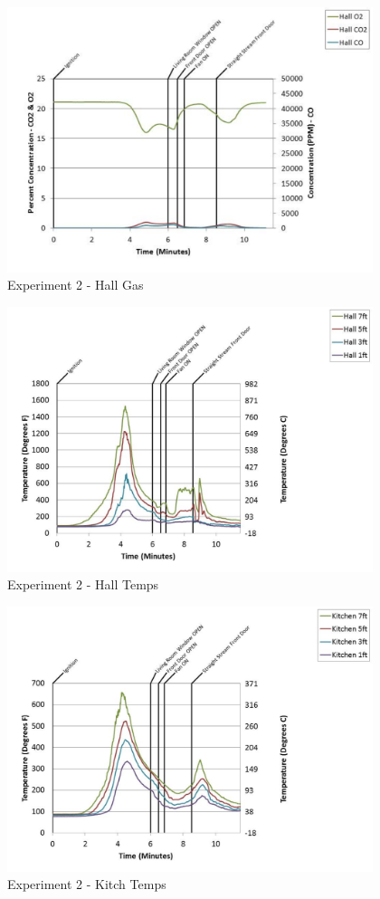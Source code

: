 \documentclass{article}
\begin{document}
\begin{appendices}
	\clearpage

	\begin{figure}[h!]
		\centering
		\includegraphics[height=3.05in]{0_Images/Results_Charts/Exp_2_Charts/HallGas.pdf}
		\caption{Experiment 2 - Hall Gas}
	\end{figure}
 

	\begin{figure}[h!]
		\centering
		\includegraphics[height=3.05in]{0_Images/Results_Charts/Exp_2_Charts/HallTemps.pdf}
		\caption{Experiment 2 - Hall Temps}
	\end{figure}
 
	\clearpage

	\begin{figure}[h!]
		\centering
		\includegraphics[height=3.05in]{0_Images/Results_Charts/Exp_2_Charts/KitchTemps.pdf}
		\caption{Experiment 2 - Kitch Temps}
	\end{figure}
 


\end{appendices}
\end{document}
